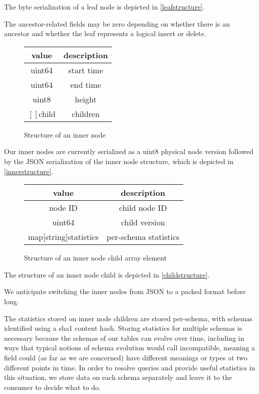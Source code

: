 \documentclass[9pt,twocolumn]{article}
\begin{document}
    The byte serialization of a leaf node is depicted in \autoref{leafstructure}.

    The ancestor-related fields may be zero depending on whether there is an
    ancestor and whether the leaf represents a logical insert or delete.

    \begin{figure}
      \begin{tabular}{ |c|c| }
        \hline
        value & description \\
        \hline
        uint64 & start time \\
        uint64 & end time \\
        uint8 & height \\
        $[]$child & children \\
        \hline
      \end{tabular}
      \caption{Structure of an inner node}
      \label{innerstructure}
    \end{figure}

    Our inner nodes are currently serialized as a uint8 physical node version
    followed by the JSON serialization of the inner node structure, which is
    depicted in \autoref{innerstructure}.

    \begin{figure}
      \begin{tabular}{ |c|c| }
        \hline
        value & description \\
        \hline
        node ID & child node ID \\
        uint64 & child version \\
        map[string]statistics & per-schema statistics \\
        \hline
      \end{tabular}
      \caption{Structure of an inner node child array element}
      \label{childstructure}
    \end{figure}

    The structure of an inner node child is depicted in \autoref{childstructure}.

    We anticipate switching the inner nodes from JSON to a packed format before
    long.

    The statistics stored on inner node children are stored per-schema, with
    schemas identified using a sha1 content hash. Storing statistics for multiple
    schemas is necessary because the schemas of our tables can evolve over time,
    including in ways that typical notions of schema evolution would call
    incompatible, meaning a field could (as far as we are concerned) have
    different meanings or types at two different points in time. In order to
    resolve queries and provide useful statistics in this situation, we store
    data on each schema separately and leave it to the consumer to decide what to
    do.
\end{document}
